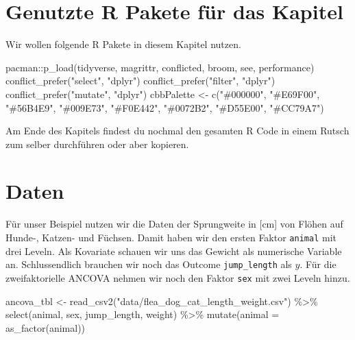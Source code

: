 \documentclass[
  letterpaper,
]{scrbook}
\newenvironment{Shaded}{\begin{snugshade}}{\end{snugshade}}
\newcommand{\AttributeTok}[1]{\textcolor[rgb]{0.40,0.45,0.13}{#1}}
\newcommand{\FunctionTok}[1]{\textcolor[rgb]{0.28,0.35,0.67}{#1}}
\newcommand{\NormalTok}[1]{\textcolor[rgb]{0.00,0.23,0.31}{#1}}
\newcommand{\OtherTok}[1]{\textcolor[rgb]{0.00,0.23,0.31}{#1}}
\newcommand{\SpecialCharTok}[1]{\textcolor[rgb]{0.37,0.37,0.37}{#1}}
\newcommand{\StringTok}[1]{\textcolor[rgb]{0.13,0.47,0.30}{#1}}
\begin{document}
\hypertarget{genutzte-r-pakete-fuxfcr-das-kapitel-8}{%
\section{Genutzte R Pakete für das
Kapitel}\label{genutzte-r-pakete-fuxfcr-das-kapitel-8}}

Wir wollen folgende R Pakete in diesem Kapitel nutzen.

\begin{Shaded}
\begin{Highlighting}[]
\NormalTok{pacman}\SpecialCharTok{::}\FunctionTok{p\_load}\NormalTok{(tidyverse, magrittr, conflicted, broom,}
\NormalTok{               see, performance)}
\FunctionTok{conflict\_prefer}\NormalTok{(}\StringTok{"select"}\NormalTok{, }\StringTok{"dplyr"}\NormalTok{)}
\FunctionTok{conflict\_prefer}\NormalTok{(}\StringTok{"filter"}\NormalTok{, }\StringTok{"dplyr"}\NormalTok{)}
\FunctionTok{conflict\_prefer}\NormalTok{(}\StringTok{"mutate"}\NormalTok{, }\StringTok{"dplyr"}\NormalTok{)}
\NormalTok{cbbPalette }\OtherTok{\textless{}{-}} \FunctionTok{c}\NormalTok{(}\StringTok{"\#000000"}\NormalTok{, }\StringTok{"\#E69F00"}\NormalTok{, }\StringTok{"\#56B4E9"}\NormalTok{, }\StringTok{"\#009E73"}\NormalTok{, }
                \StringTok{"\#F0E442"}\NormalTok{, }\StringTok{"\#0072B2"}\NormalTok{, }\StringTok{"\#D55E00"}\NormalTok{, }\StringTok{"\#CC79A7"}\NormalTok{)}
\end{Highlighting}
\end{Shaded}

Am Ende des Kapitels findest du nochmal den gesamten R Code in einem
Rutsch zum selber durchführen oder aber kopieren.

\hypertarget{daten-1}{%
\section{Daten}\label{daten-1}}

Für unser Beispiel nutzen wir die Daten der Sprungweite in {[}cm{]} von
Flöhen auf Hunde-, Katzen- und Füchsen. Damit haben wir den ersten
Faktor \texttt{animal} mit drei Leveln. Als Kovariate schauen wir uns
das Gewicht als numerische Variable an. Schlussendlich brauchen wir noch
das Outcome \texttt{jump\_length} als \(y\). Für die zweifaktorielle
ANCOVA nehmen wir noch den Faktor \texttt{sex} mit zwei Leveln hinzu.

\begin{Shaded}
\begin{Highlighting}[]
\NormalTok{ancova\_tbl }\OtherTok{\textless{}{-}} \FunctionTok{read\_csv2}\NormalTok{(}\StringTok{"data/flea\_dog\_cat\_length\_weight.csv"}\NormalTok{) }\SpecialCharTok{\%\textgreater{}\%}
  \FunctionTok{select}\NormalTok{(animal, sex, jump\_length, weight) }\SpecialCharTok{\%\textgreater{}\%} 
  \FunctionTok{mutate}\NormalTok{(}\AttributeTok{animal =} \FunctionTok{as\_factor}\NormalTok{(animal))}
\end{Highlighting}
\end{Shaded}
\end{document}
